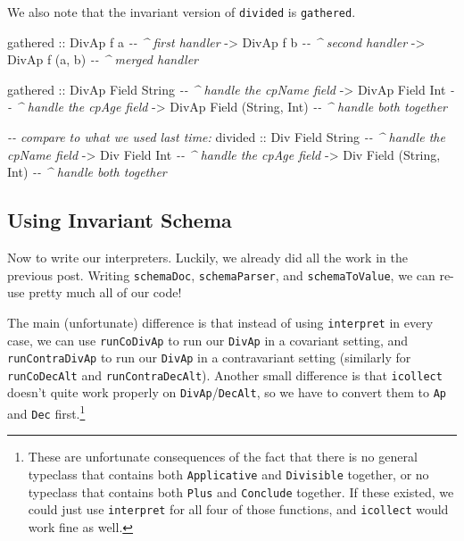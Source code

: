 \documentclass[]{article}
\newenvironment{Shaded}{}{}
\newcommand{\CommentTok}[1]{\textcolor[rgb]{0.38,0.63,0.69}{\textit{#1}}}
\newcommand{\DataTypeTok}[1]{\textcolor[rgb]{0.56,0.13,0.00}{#1}}
\newcommand{\NormalTok}[1]{#1}
\newcommand{\OtherTok}[1]{\textcolor[rgb]{0.00,0.44,0.13}{#1}}
\begin{document}
We also note that the invariant version of \texttt{divided} is
\texttt{gathered}.

\begin{Shaded}
\begin{Highlighting}[]
\NormalTok{gathered}
\OtherTok{    ::} \DataTypeTok{DivAp}\NormalTok{ f a          }\CommentTok{{-}{-} \^{} first handler}
    \OtherTok{{-}>} \DataTypeTok{DivAp}\NormalTok{ f b          }\CommentTok{{-}{-} \^{} second handler}
    \OtherTok{{-}>} \DataTypeTok{DivAp}\NormalTok{ f (a, b)     }\CommentTok{{-}{-} \^{} merged handler}

\NormalTok{gathered}
\OtherTok{    ::} \DataTypeTok{DivAp} \DataTypeTok{Field} \DataTypeTok{String}          \CommentTok{{-}{-} \^{} handle the cpName field}
    \OtherTok{{-}>} \DataTypeTok{DivAp} \DataTypeTok{Field} \DataTypeTok{Int}             \CommentTok{{-}{-} \^{} handle the cpAge field}
    \OtherTok{{-}>} \DataTypeTok{DivAp} \DataTypeTok{Field}\NormalTok{ (}\DataTypeTok{String}\NormalTok{, }\DataTypeTok{Int}\NormalTok{)   }\CommentTok{{-}{-} \^{} handle both together}

\CommentTok{{-}{-} compare to what we used last time:}
\NormalTok{divided}
\OtherTok{    ::} \DataTypeTok{Div} \DataTypeTok{Field} \DataTypeTok{String}          \CommentTok{{-}{-} \^{} handle the cpName field}
    \OtherTok{{-}>} \DataTypeTok{Div} \DataTypeTok{Field} \DataTypeTok{Int}             \CommentTok{{-}{-} \^{} handle the cpAge field}
    \OtherTok{{-}>} \DataTypeTok{Div} \DataTypeTok{Field}\NormalTok{ (}\DataTypeTok{String}\NormalTok{, }\DataTypeTok{Int}\NormalTok{)   }\CommentTok{{-}{-} \^{} handle both together}
\end{Highlighting}
\end{Shaded}

\hypertarget{using-invariant-schema}{%
\subsection{Using Invariant Schema}\label{using-invariant-schema}}

Now to write our interpreters. Luckily, we already did all the work in the
previous post. Writing \texttt{schemaDoc}, \texttt{schemaParser}, and
\texttt{schemaToValue}, we can re-use pretty much all of our code!

The main (unfortunate) difference is that instead of using \texttt{interpret} in
every case, we can use \texttt{runCoDivAp} to run our \texttt{DivAp} in a
covariant setting, and \texttt{runContraDivAp} to run our \texttt{DivAp} in a
contravariant setting (similarly for \texttt{runCoDecAlt} and
\texttt{runContraDecAlt}). Another small difference is that \texttt{icollect}
doesn't quite work properly on \texttt{DivAp}/\texttt{DecAlt}, so we have to
convert them to \texttt{Ap} and \texttt{Dec} first.\footnote{These are
  unfortunate consequences of the fact that there is no general typeclass that
  contains both \texttt{Applicative} and \texttt{Divisible} together, or no
  typeclass that contains both \texttt{Plus} and \texttt{Conclude} together. If
  these existed, we could just use \texttt{interpret} for all four of those
  functions, and \texttt{icollect} would work fine as well.}
\end{document}

